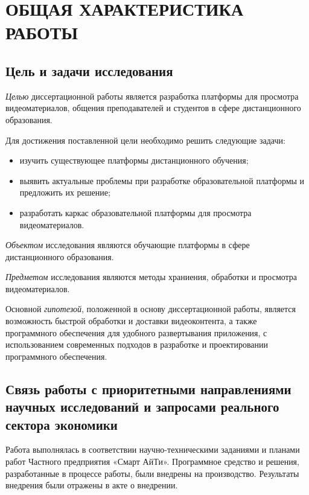 \section*{ОБЩАЯ ХАРАКТЕРИСТИКА РАБОТЫ}

\subsection*{Цель и задачи исследования}

\textit{Целью} диссертационной работы является разработка платформы для просмотра видеоматериалов,
общения преподавателей и студентов в сфере дистанционного образования.

Для достижения поставленной цели необходимо решить следующие задачи:
\begin{itemize}[wide,topsep=0pt]
  \itemsep0em
  \item изучить существующее платформы дистанционного обучения;
  \item выявить актуальные проблемы при разработке образовательной платформы и предложить их решение;
  \item разработать каркас образовательной платформы для просмотра видеоматериалов.
\end{itemize}

\textit{Объектом} исследования являются обучающие платформы в сфере дистанционного образования.


\textit{Предметом} исследования являются методы храниения, обработки и просмотра видеоматериалов.

Основной \textit{гипотезой}, положенной в основу диссертационной работы, является возможность
быстрой обработки и доставки видеоконтента, а также программного обеспечения для удобного
развертывания приложения, с использованием современных подходов в разработке и проектировании
программного обеспечения.

\subsection*{Связь работы с приоритетными направлениями научных исследований и запросами реального сектора
экономики}

Работа выполнялась в соответствии научно-техническими заданиями и планами работ
Частного предприятия «Смарт АйТи». Программное средство и решения, разработанные в процессе работы,
были внедрены на производство. Результаты внедрения были отражены в акте о внедрении.

